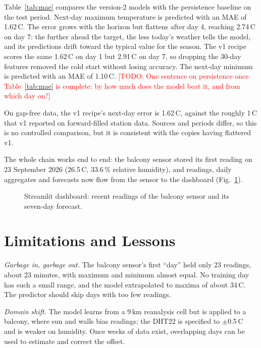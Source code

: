 \documentclass[conference]{IEEEtran}
\newcommand{\todo}[1]{\textcolor{red}{[TODO: #1]}}
\newcommand{\degc}{\,\textdegree C}
\newcommand{\figplaceholder}[2]{%
  \fbox{\parbox[c][#2][c]{0.92\columnwidth}{\centering\small\textcolor{red}{#1}}}}
\begin{document}
Table~\ref{tab:mae} compares the version-2 models with the persistence baseline on the test period. Next-day maximum temperature is predicted with an MAE of 1.62\degc{}. The error grows with the horizon but flattens after day 4, reaching 2.74\degc{} on day 7: the further ahead the target, the less today's weather tells the model, and its predictions drift toward the typical value for the season. The v1 recipe scores the same 1.62\degc{} on day 1 but 2.91\degc{} on day 7, so dropping the 30-day features removed the cold start without losing accuracy. The next-day minimum is predicted with an MAE of 1.10\degc{}. \todo{One sentence on persistence once Table~\ref{tab:mae} is complete: by how much does the model beat it, and from which day on?}

On gap-free data, the v1 recipe's next-day error is 1.62\degc{}, against the roughly 1\degc{} that v1 reported on forward-filled station data. Sources and periods differ, so this is no controlled comparison, but it is consistent with the copies having flattered v1.

The whole chain works end to end: the balcony sensor stored its first reading on 23 September 2026 (26.5\degc{}, 33.6\,\% relative humidity), and readings, daily aggregates and forecasts now flow from the sensor to the dashboard (Fig.~\ref{fig:dashboard}).

\begin{figure}[t]
\centering
\figplaceholder{Insert dashboard screenshot (readings chart + 7-day forecast)}{4cm}
\caption{Streamlit dashboard: recent readings of the balcony sensor and its seven-day forecast.}
\label{fig:dashboard}
\end{figure}

\section{Limitations and Lessons}
\label{sec:limits}

\textit{Garbage in, garbage out.} The balcony sensor's first ``day'' held only 23 readings, about 23 minutes, with maximum and minimum almost equal. No training day has such a small range, and the model extrapolated to maxima of about 34\degc{}. The predictor should skip days with too few readings.

\textit{Domain shift.} The model learns from a 9\,km reanalysis cell but is applied to a balcony, where sun and walls bias readings; the DHT22 is specified to $\pm$0.5\degc{}~\cite{b14} and is weaker on humidity. Once weeks of data exist, overlapping days can be used to estimate and correct the offset.
\end{document}
